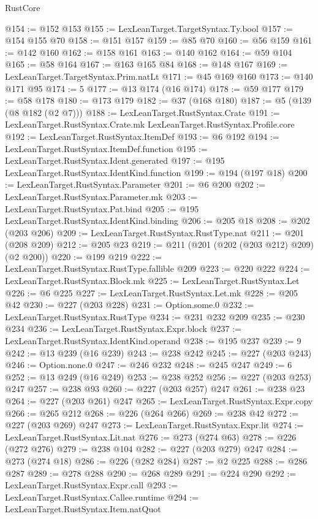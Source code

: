 \begin{lexlean}{RustCore}
\begin{coremodule}
@154 := @152 @153
@155 := LexLeanTarget.TargetSyntax.Ty.bool
@157 := @154 @155 @70
@158 := @151 @157
@159 := @85 @70
@160 := @56 @159
@161 := @142 @160
@162 := @158 @161
@163 := @140 @162
@164 := @59 @104
@165 := @58 @164
@167 := @163 @165 @84
@168 := @148 @167
@169 := LexLeanTarget.TargetSyntax.Prim.natLt
@171 := @45 @169 @160
@173 := @140 @171 @95
@174 := 5
@177 := @13 @174 (@16 @174)
@178 := @59 @177
@179 := @58 @178
@180 := @173 @179
@182 := @37 (@168 @180)
@187 := @5 (@139 (@8 @182 (@2 @7)))
@188 := LexLeanTarget.RustSyntax.Crate
@191 := LexLeanTarget.RustSyntax.Crate.mk LexLeanTarget.RustSyntax.Profile.core
@192 := LexLeanTarget.RustSyntax.ItemDef
@193 := @6 @192
@194 := LexLeanTarget.RustSyntax.ItemDef.function
@195 := LexLeanTarget.RustSyntax.Ident.generated
@197 := @195 LexLeanTarget.RustSyntax.IdentKind.function
@199 := @194 (@197 @18)
@200 := LexLeanTarget.RustSyntax.Parameter
@201 := @6 @200
@202 := LexLeanTarget.RustSyntax.Parameter.mk
@203 := LexLeanTarget.RustSyntax.Pat.bind
@205 := @195 LexLeanTarget.RustSyntax.IdentKind.binding
@206 := @205 @18
@208 := @202 (@203 @206)
@209 := LexLeanTarget.RustSyntax.RustType.nat
@211 := @201 (@208 @209)
@212 := @205 @23
@219 := @211 (@201 (@202 (@203 @212) @209) (@2 @200))
@220 := @199 @219
@222 := LexLeanTarget.RustSyntax.RustType.fallible @209
@223 := @220 @222
@224 := LexLeanTarget.RustSyntax.Block.mk
@225 := LexLeanTarget.RustSyntax.Let
@226 := @6 @225
@227 := LexLeanTarget.RustSyntax.Let.mk
@228 := @205 @42
@230 := @227 (@203 @228)
@231 := Option.some.{0}
@232 := LexLeanTarget.RustSyntax.RustType
@234 := @231 @232 @209
@235 := @230 @234
@236 := LexLeanTarget.RustSyntax.Expr.block
@237 := LexLeanTarget.RustSyntax.IdentKind.operand
@238 := @195 @237
@239 := 9
@242 := @13 @239 (@16 @239)
@243 := @238 @242
@245 := @227 (@203 @243)
@246 := Option.none.{0}
@247 := @246 @232
@248 := @245 @247
@249 := 6
@252 := @13 @249 (@16 @249)
@253 := @238 @252
@256 := @227 (@203 @253) @247
@257 := @238 @93
@260 := @227 (@203 @257) @247
@261 := @238 @23
@264 := @227 (@203 @261) @247
@265 := LexLeanTarget.RustSyntax.Expr.copy
@266 := @265 @212
@268 := @226 (@264 @266)
@269 := @238 @42
@272 := @227 (@203 @269) @247
@273 := LexLeanTarget.RustSyntax.Expr.lit
@274 := LexLeanTarget.RustSyntax.Lit.nat
@276 := @273 (@274 @63)
@278 := @226 (@272 @276)
@279 := @238 @104
@282 := @227 (@203 @279) @247
@284 := @273 (@274 @18)
@286 := @226 (@282 @284)
@287 := @2 @225
@288 := @286 @287
@289 := @278 @288
@290 := @268 @289
@291 := @224 @290
@292 := LexLeanTarget.RustSyntax.Expr.call
@293 := LexLeanTarget.RustSyntax.Callee.runtime
@294 := LexLeanTarget.RustSyntax.Item.natQuot

\end{coremodule}
\end{lexlean}
